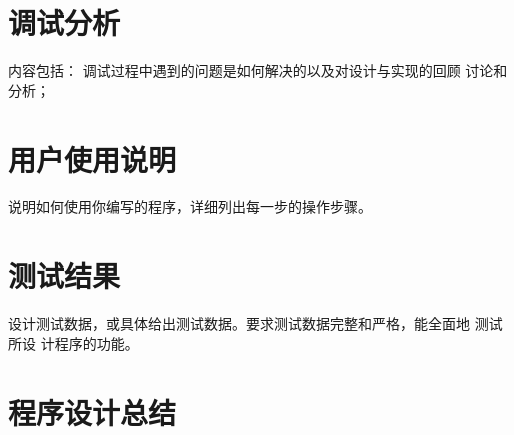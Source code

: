 \documentclass[UTF8]{ctexart}
\begin{document}
\section{调试分析}
内容包括： 调试过程中遇到的问题是如何解决的以及对设计与实现的回顾
讨论和分析；
\section{用户使用说明}
说明如何使用你编写的程序，详细列出每一步的操作步骤。
\section{测试结果}
设计测试数据，或具体给出测试数据。要求测试数据完整和严格，能全面地
测试所设
计程序的功能。
\section{程序设计总结}

\nocite{Lippman:2012:CP:2423877}%
\end{document}
